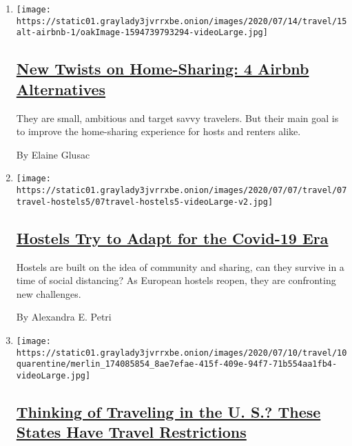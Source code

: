 \begin{enumerate}
\def\labelenumi{\arabic{enumi}.}
\item
  \texttt{[image: https://static01.graylady3jvrrxbe.onion/images/2020/07/14/travel/15alt-airbnb-1/oakImage-1594739793294-videoLarge.jpg]}

  \hypertarget{new-twists-on-home-sharing-4-airbnb-alternatives}{%
  \subsection{\texorpdfstring{\href{/2020/07/15/travel/airbnb-alternatives-home-sharing.html}{New
  Twists on Home-Sharing: 4 Airbnb
  Alternatives}}{New Twists on Home-Sharing: 4 Airbnb Alternatives}}\label{new-twists-on-home-sharing-4-airbnb-alternatives}}

  They are small, ambitious and target savvy travelers. But their main
  goal is to improve the home-sharing experience for hosts and renters
  alike.

  By Elaine Glusac
\item
  \texttt{[image: https://static01.graylady3jvrrxbe.onion/images/2020/07/07/travel/07travel-hostels5/07travel-hostels5-videoLarge-v2.jpg]}

  \hypertarget{hostels-try-to-adapt-for-the-covid-19-era}{%
  \subsection{\texorpdfstring{\href{/2020/07/07/travel/virus-hostels-backpacking.html}{Hostels
  Try to Adapt for the Covid-19
  Era}}{Hostels Try to Adapt for the Covid-19 Era}}\label{hostels-try-to-adapt-for-the-covid-19-era}}

  Hostels are built on the idea of community and sharing, can they
  survive in a time of social distancing? As European hostels reopen,
  they are confronting new challenges.

  By Alexandra E. Petri
\item
  \texttt{[image: https://static01.graylady3jvrrxbe.onion/images/2020/07/10/travel/10quarentine/merlin\_174085854\_8ae7efae-415f-409e-94f7-71b554aa1fb4-videoLarge.jpg]}

  \hypertarget{thinking-of-traveling-in-the-u-s-these-states-have-travel-restrictions}{%
  \subsection{\texorpdfstring{\href{/2020/07/10/travel/state-travel-restrictions.html}{Thinking
  of Traveling in the U. S.? These States Have Travel
  Restrictions}}{Thinking of Traveling in the U. S.? These States Have Travel Restrictions}}\label{thinking-of-traveling-in-the-u-s-these-states-have-travel-restrictions}}


\end{enumerate}
